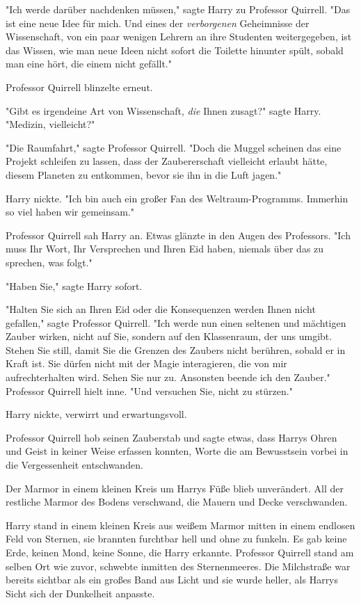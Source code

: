 {"Ich werde darüber nachdenken müssen," sagte Harry zu Professor Quirrell. "Das ist eine neue Idee für mich. Und eines der \emph{verborgenen} Geheimnisse der Wissenschaft, von ein paar wenigen Lehrern an ihre Studenten weitergegeben, ist das Wissen, wie man neue Ideen nicht sofort die Toilette hinunter spült, sobald man eine hört, die einem nicht gefällt."

Professor Quirrell blinzelte erneut.

"Gibt es irgendeine Art von Wissenschaft, \emph{die} Ihnen zusagt?" sagte Harry. "Medizin, vielleicht?"

"Die Raumfahrt," sagte Professor Quirrell. "Doch die Muggel scheinen das eine Projekt schleifen zu lassen, dass der Zaubererschaft vielleicht erlaubt hätte, diesem Planeten zu entkommen, bevor sie ihn in die Luft jagen."

Harry nickte. "Ich bin auch ein großer Fan des Weltraum-Programms. Immerhin so viel haben wir gemeinsam."

Professor Quirrell sah Harry an. Etwas glänzte in den Augen des Professors. "Ich muss Ihr Wort, Ihr Versprechen und Ihren Eid haben, niemals über das zu sprechen, was folgt."

"Haben Sie," sagte Harry sofort.

"Halten Sie sich an Ihren Eid oder die Konsequenzen werden Ihnen nicht gefallen," sagte Professor Quirrell. "Ich werde nun einen seltenen und mächtigen Zauber wirken, nicht auf Sie, sondern auf den Klassenraum, der uns umgibt. Stehen Sie still, damit Sie die Grenzen des Zaubers nicht berühren, sobald er in Kraft ist. Sie dürfen nicht mit der Magie interagieren, die von mir aufrechterhalten wird. Sehen Sie nur zu. Ansonsten beende ich den Zauber." Professor Quirrell hielt inne. "Und versuchen Sie, nicht zu stürzen."

Harry nickte, verwirrt und erwartungsvoll.

Professor Quirrell hob seinen Zauberstab und sagte etwas, dass Harrys Ohren und Geist in keiner Weise erfassen konnten, Worte die am Bewusstsein vorbei in die Vergessenheit entschwanden.

Der Marmor in einem kleinen Kreis um Harrys Füße blieb unverändert. All der restliche Marmor des Bodens verschwand, die Mauern und Decke verschwanden.

Harry stand in einem kleinen Kreis aus weißem Marmor mitten in einem endlosen Feld von Sternen, sie brannten furchtbar hell und ohne zu funkeln. Es gab keine Erde, keinen Mond, keine Sonne, die Harry erkannte. Professor Quirrell stand am selben Ort wie zuvor, schwebte inmitten des Sternenmeeres. Die Milchstraße war bereits sichtbar als ein großes Band aus Licht und sie wurde heller, als Harrys Sicht sich der Dunkelheit anpasste.

}
